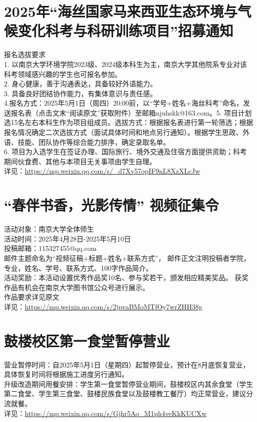 \documentclass[letterpaper, 12pt]{article}
\begin{document}
\begin{multicols}{2}
\section{2025年“海丝国家马来西亚生态环境与气候变化科考与科研训练项目”招募通知} %
报名选拔要求
\\1. 以南京大学环境学院2023级、2024级本科生为主，南京大学其他院系专业对该科考领域感兴趣的学生也可报名参加。
\\2. 身心健康，善于沟通表达，具备较好外语能力。
\\3. 具备良好团结协作能力，有集体意识与责任感。
\\4.报名方式：2025年5月1日（周四）20:00前，以“学号+姓名+海丝科考”命名，发送报名表（点击文末“阅读原文”获取附件）至邮箱njuhskk@163.com。5. 项目计划选15名左右本科生作为项目组成员。选拔方式：根据报名表进行第一轮筛选；根据报名情况确定二次选拔方式（面试具体时间和地点另行通知）。根据学生思政、外语、技能、团队协作等综合能力排序，确定录取名单。
\\6. 项目为入选学生在签证办理、国际旅行、境外交通及住宿方面提供资助；科考期间伙食费、其他与本项目无关事项由学生自理。
\\详见：\url{https://mp.weixin.qq.com/s/_d7Xv57opIF9nL8XzXLcJw}

\section{“春伴书香，光影传情” 视频征集令} %
活动对象：南京大学全体师生
\\活动时间：2025年4月28日-2025年5月10日
\\投稿邮箱：115327455@qq.com
\\邮件主题命名为“视频征稿+标题+姓名+联系方式”， 邮件正文注明投稿者学院，专业，姓名、学号、联系方式、100字作品简介。
\\活动奖励：本活动设置优秀作品奖10名、参与奖若干，颁发相应精美奖品。 获奖作品有机会在南京大学图书馆公众号进行展示。
\\作品要求详见原文
\\详见：\url{https://mp.weixin.qq.com/s/2jpvaBMoMTfOy7wrZHH38g}

\section{鼓楼校区第一食堂暂停营业} %
营业暂停时间：自2025年5月1日（星期四）起暂停营业，预计在8月底恢复营业，具体恢复时间将根据施工进度另行通知。
\\升级改造期间用餐安排：学生第一食堂暂停营业期间，鼓楼校区内其余食堂（学生第二食堂、学生第三食堂、鼓楼民族食堂以及鼓楼教工餐厅）均正常营业，建议分流就餐。
\\详见：\url{https://mp.weixin.qq.com/s/Gjhr5Ao_M1ph4veKkKUCXw}

\end{multicols}
\end{document}
